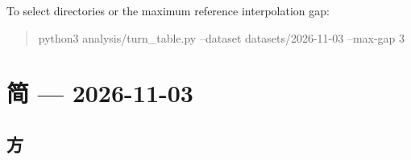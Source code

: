 \documentclass[11pt,a4paper]{article}
\numberwithin{equation}{section}
\numberwithin{figure}{section}
\begin{document}
To select directories or the maximum reference interpolation gap:

\begin{quote}\ttfamily\footnotesize python3 analysis/\allowbreak{}turn\_table.py --dataset datasets/\allowbreak{}2026-11-03 --max-gap 3\end{quote}

\clearpage\section{{\cjkfont 简}\allowbreak{} — 2026-11-03}

\subsection{{\cjkfont 方}\allowbreak{}}
\end{document}
